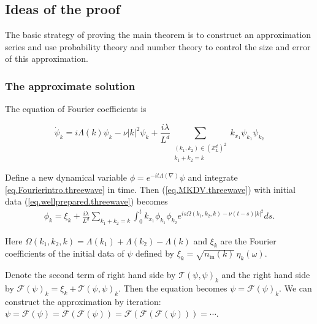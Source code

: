 \subsection{Ideas of the proof} The basic strategy of proving the main theorem is to construct an approximation series and use probability theory and number theory to control the size and error of this approximation.


\subsubsection{The approximate solution}\label{sec.appsol} The equation of Fourier coefficients is

\begin{equation}\label{eq.Fourierintro.threewave}
\dot{\psi}_{k} =  i\Lambda(k) \psi_k -\nu |k|^2 \psi_k
 +\frac{i\lambda}{L^{d}} \sum\limits_{\substack{(k_1,k_2) \in (\mathbb{Z}^d_L)^2 \\ k_1 + k_2 = k}} k_{x_1}\psi_{k_1} \psi_{k_2}
\end{equation}



Define a new dynamical variable $\phi= e^{-it\Lambda(\nabla)} \psi$ and integrate \eqref{eq.Fourierintro.threewave} in time. Then (\ref{eq.MKDV.threewave}) with initial data (\ref{eq.wellprepared.threewave}) becomes
\begin{equation}\label{eq.intmainintro.threewave}
\begin{split}
    \phi_k =\xi_k+\frac{i\lambda}{L^{d}} \sum\limits_{k_1 + k_2 = k}\int^{t}_0k_{x_1}\phi_{k_1} \phi_{k_2}e^{i s\Omega(k_1,k_2,k)-\nu(t-s)|k|^2} ds.  
\end{split}
\end{equation}

Here $\Omega(k_1,k_2,k) =\Lambda(k_1)+\Lambda(k_2)-\Lambda(k)$ and $\xi_k$ are the Fourier coefficients of the initial data of $\psi$ defined by $\xi_k=\sqrt{n_{\textrm{in}}(k)} \, \eta_{k}(\omega)$.



Denote the second term of right hand side by $\mathcal{T}(\psi,\psi)_k$ and the right hand side by $\mathcal{F}(\psi)_k=\xi_k+\mathcal{T}(\psi,\psi)_k$. Then the equation becomes $\psi=\mathcal{F}(\psi)_k$. We can construct the approximation by iteration: $\psi=\mathcal{F}(\psi)=\mathcal{F}(\mathcal{F}(\psi))=\mathcal{F}(\mathcal{F}(\mathcal{F}(\psi)))=\cdots$. 

